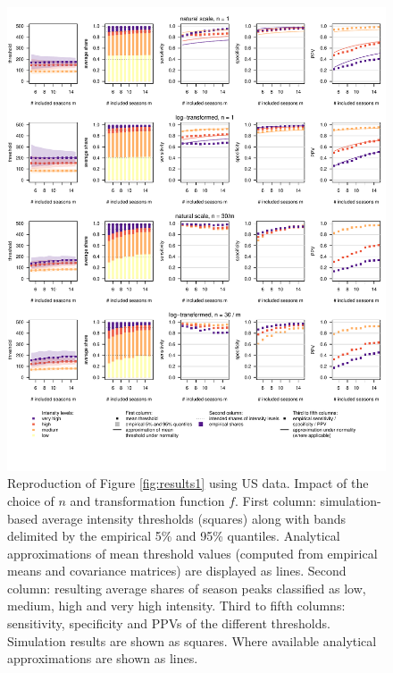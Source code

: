 \documentclass[12pt]{article}
\begin{document}
\begin{figure}[h!]
\centering
\includegraphics[width=1\textwidth]{figure/plot_us.pdf}

\vspace{-1.5cm}

\caption{Reproduction of Figure \ref{fig:results1} using US data. Impact of the choice of $n$ and transformation function $f$. First column: simulation-based average intensity thresholds (squares) along with bands delimited by the empirical 5\% and 95\% quantiles. Analytical approximations of mean threshold values (computed from empirical means and covariance matrices) are displayed as lines. Second column: resulting average shares of season peaks classified as low, medium, high and very high intensity. Third to fifth columns: sensitivity, specificity and PPVs of the different thresholds. Simulation results are shown as squares. Where available analytical approximations are shown as lines.}
\label{fig:results1_us}
\end{figure}

\newpage
\end{document}
